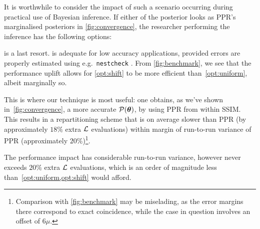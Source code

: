 \documentclass[usenatbib]{mnras}
\begin{document}
It is worthwhile to consider the impact of such a scenario occurring
during practical use of Bayesian inference. If either of the posterior
looks as PPR's marginalised posteriors in \cref{fig:convergence}, the
researcher performing the inference has the following options:
 is a last resort.  is
adequate for low accuracy applications, provided errors are properly
estimated using e.g.~\texttt{nestcheck} \cite{higson2018nestcheck}.
From \cref{fig:benchmark}, we see that the performance uplift allows
for \cref{opt:shift} to be more efficient than~\ref{opt:uniform},
albeit marginally so.

This is where our technique is most useful: one obtains, as we've
shown in~\cref{fig:convergence}, a more accurate
\({\cal P}(\bm{\theta})\), by using PPR from within SSIM. This results
in a repartitioning scheme that is on average slower than PPR (by
approximately \(18\%\) extra \({\cal L}\) evaluations) within margin
of run-to-run variance of PPR (approximately
\(20\%\))\footnote{Comparison with \cref{fig:benchmark} may be
  miselading, as the error margins there correspond to exact
  coincidence, while the case in question involves an offset of
  $6\mu$. }.

The
performance impact has considerable run-to-run variance, however never
exceeds \(20\%\) extra \({\cal L}\) evaluations, which is an order of
magnitude less than~\vref{opt:uniform,opt:shift} would afford.
\end{document}
